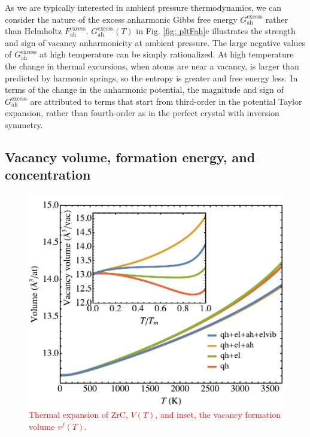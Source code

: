 \documentclass[twocolumn,american,aps,prb,showpacs,showkeys,amsmath,amssymb,superscriptaddress,a4]{revtex4-1}
\begin{document}
As we are typically interested in ambient pressure thermodynamics, we can consider the nature of the excess anharmonic Gibbs free energy $G_{\text{ah}}^{\text{excess}}$ rather than Helmholtz  $F_{\text{ah}}^{\text{excess}}$. $G_{\text{ah}}^{\text{excess}}(T)$ in Fig. \ref{fig: pltFah}c illustrates the strength and sign of vacancy anharmonicity at ambient pressure. The large negative values of $G_{\text{ah}}^{\text{excess}}$ at high temperature can be simply rationalized. At high temperature the change in
thermal excursions, when atoms are near a vacancy, is larger than
predicted by harmonic springs, so the entropy is greater and free
energy less. In terms of the change in the anharmonic potential, the magnitude and
sign of $G_{\text{ah}}^{\text{excess}}$ are attributed to terms that start from
third-order in the potential Taylor expansion, rather than fourth-order
as in the perfect crystal with inversion symmetry.

\subsection{Vacancy volume, formation energy, and concentration\label{subsec: anharmonicVacancyEnergy}}

\begin{figure}[h]
\begin{centering}
\includegraphics[scale=0.56]{Fig5_pltVolExpansion}
\par\end{centering}
\caption{\foreignlanguage{american}{ \textcolor{red}{Thermal expansion of ZrC, $V(T)$, and inset, the vacancy formation volume $v^f(T)$}. \label{fig: pltVolExpansion}}}
\end{figure}
\end{document}
